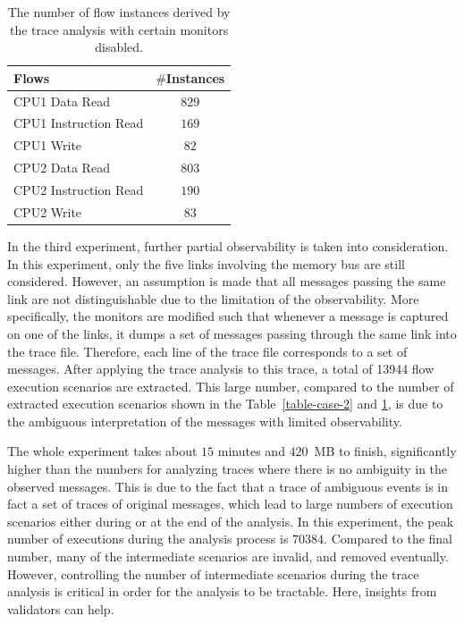 \documentclass[conference]{IEEEtran}
\begin{document}
\begin{table}[tb]
\caption{The number of flow instances derived by the trace analysis with certain monitors disabled.}
\begin{center}
\begin{tabular}{|l|c|}
\hline
Flows & $\#$Instances \\
\hline
\hline
CPU1 Data Read			&  $829$\\
CPU1 Instruction Read		&  $169$\\
CPU1 Write				&  $82$\\
\hline
CPU2 Data Read			&  $803$\\
CPU2 Instruction Read		&  $190$\\
CPU2 Write				&  $83$\\
\hline
\end{tabular}
\end{center}
\label{table-par-obs}
\end{table}%

In the third experiment, further partial observability is taken into consideration.  In this experiment, only the five links involving the memory bus are still considered.  However, an assumption is made that all messages passing the same link are not distinguishable due to the limitation of the observability.  More specifically, the monitors are modified such that whenever a message is captured on one of the links, it dumps a set of messages passing through the same link into the trace file.  Therefore, each line of the trace file corresponds to a set of messages.  After applying the trace analysis to this trace,  a total of 13944 flow execution scenarios are extracted.    This large number, compared to the number of extracted execution scenarios shown in the Table~\ref{table-case-2} and \ref{table-par-obs}, is due to the ambiguous interpretation of the messages with limited observability.  

The whole experiment takes about $15$ minutes and $420$~MB to finish, significantly higher than the numbers for analyzing traces where there is no ambiguity in the observed messages.  This is due to the fact that a trace of ambiguous events is in fact a set of traces of original messages, which lead to large numbers of execution scenarios either during or at the end of the analysis.  In this experiment, the peak number of executions during the analysis process is $70384$.   Compared to the final number, many of the intermediate scenarios are invalid, and removed eventually.  However, controlling the number of intermediate scenarios during the trace analysis is critical in order for the analysis to be tractable.  Here, insights from validators can help.    
\end{document}
